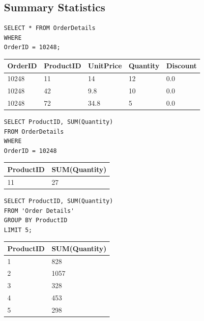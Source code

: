 \documentclass[10pt]{article}
\begin{document}
\subsection{Summary Statistics}

\begin{verbatim}
SELECT * FROM OrderDetails
WHERE 
OrderID = 10248;
\end{verbatim}

\begin{table}[H]
\begin{tabular}{|l|l|l|l|l|}
\hline
OrderID	& ProductID	& UnitPrice	& Quantity	& Discount \\
\hline
10248	& 11	& 14	& 12	& 0.0 \\
10248	& 42	& 9.8	& 10	& 0.0 \\
10248	& 72	& 34.8	& 5	& 0.0 \\
\hline
\end{tabular}
\end{table}


\begin{verbatim}
SELECT ProductID, SUM(Quantity) 
FROM OrderDetails
WHERE 
OrderID = 10248
\end{verbatim}

\begin{table}[H]
\begin{tabular}{|l|l|}
\hline
ProductID	& SUM(Quantity) \\
\hline
11	& 27 \\
\hline
\end{tabular}
\end{table}


\begin{verbatim}
SELECT ProductID, SUM(Quantity) 
FROM 'Order Details'
GROUP BY ProductID 
LIMIT 5;
\end{verbatim}

\begin{table}[H]
\begin{tabular}{|l|l|}
\hline
ProductID	& SUM(Quantity) \\
\hline
1	& 828 \\
2	& 1057 \\
3	& 328 \\
4	& 453 \\
5	& 298 \\
\hline
\end{tabular}
\end{table}
\end{document}
